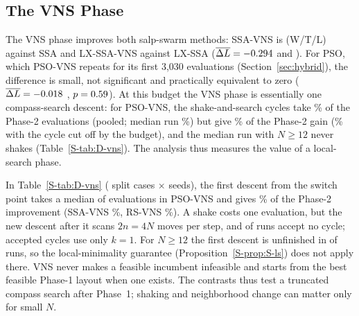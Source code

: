 \subsection{The VNS Phase}
\label{sec:abl-vns}
The VNS phase improves both salp-swarm methods: SSA-VNS is \NAblSSAVNSvsSSA{} (W/T/L) against SSA and LX-SSA-VNS \NAblLXSSAVNSvsLXSSA{} against LX-SSA ($\overline{\Delta L}=-0.294$ and \NCmLXSSAVNSvsLXSSADL). For PSO, which PSO-VNS repeats for its first 3,030 evaluations (Section~\ref{sec:hybrid}), the difference is small, not significant and practically equivalent to zero ($\overline{\Delta L}=-0.018$ \NEqPSOVNSvsPSOCI, $p=0.59$). At this budget the VNS phase is essentially one compass-search descent: for PSO-VNS, the shake-and-search cycles take \NDCycleEvalsPctPSOVNS\% of the Phase-2 evaluations (pooled; median run \NDCycleEvalsPctMedianPSOVNS\%) but give \NDCycleSharePSOVNS\% of the Phase-2 gain (\NDCycleAllSharePSOVNS\% with the cycle cut off by the budget), and the median run with $N\ge12$ never shakes (Table~\ref{S-tab:D-vns}). The analysis thus measures the value of a local-search phase.

In Table~\ref{S-tab:D-vns} (\NDVnsCases{} split cases $\times$ \NDVnsSeeds{} seeds), the first descent from the switch point takes a median of \NDDescentEvalsPSOVNS{} evaluations in PSO-VNS and gives \NDDescentSharePSOVNS\% of the Phase-2 improvement (SSA-VNS \NDDescentShareSSAVNS\%, RS-VNS \NDDescentShareRSVNS\%). A shake costs one evaluation, but the new descent after it scans $2n=4N$ moves per step, and \NDNoAcceptedPSOVNS{} of \NDVnsRunsPSOVNS{} runs accept no cycle; accepted cycles use only $k=1$. For $N\ge12$ the first descent is unfinished in \NDDescentUnfinishedLargePSOVNS{} of \NDRunsLargePSOVNS{} runs, so the local-minimality guarantee (Proposition~\ref{S-prop:S-ls}) does not apply there. VNS never makes a feasible incumbent infeasible and starts from the best feasible Phase-1 layout when one exists. The contrasts thus test a truncated compass search after Phase~1; shaking and neighborhood change can matter only for small $N$.

